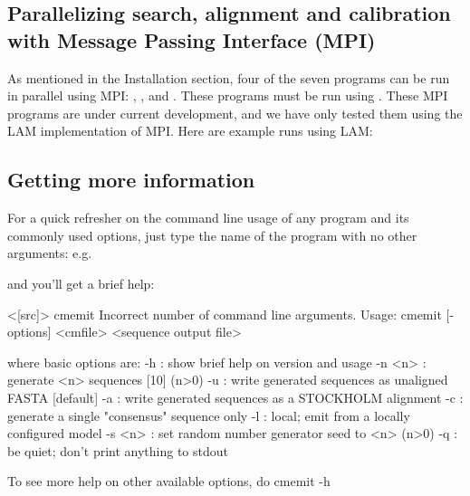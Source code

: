 \subsection{Parallelizing search, alignment and calibration with Message Passing
  Interface (MPI)}
As mentioned in the Installation section, four of
the seven  programs can be run in parallel using
MPI: , ,  and .
These programs must be run using . These MPI programs are
under current development, and we have only tested them using the LAM
implementation of MPI. Here are example runs using LAM:  





\subsection{Getting more information}

For a quick refresher on the command line usage of any program and its
commonly used options, just type the name of the program with no other
arguments: e.g.\


and you'll get a brief help:

\begin{sreoutput}
<[src]> cmemit
Incorrect number of command line arguments.
Usage: cmemit [-options] <cmfile> <sequence output file>

  where basic options are:
  -h           : show brief help on version and usage
  -n <n>       : generate <n> sequences  [10]  (n>0)
  -u           : write generated sequences as unaligned FASTA  [default]
  -a           : write generated sequences as a STOCKHOLM alignment
  -c           : generate a single "consensus" sequence only
  -l           : local; emit from a locally configured model
  -s <n>       : set random number generator seed to <n>  (n>0)
  -q           : be quiet; don't print anything to stdout

\end{sreoutput}
To see more help on other available options, do cmemit -h


